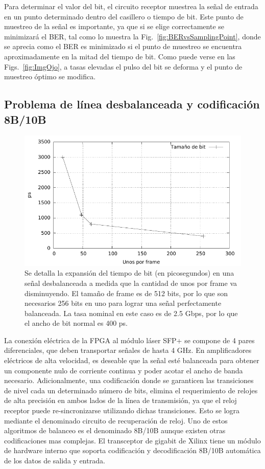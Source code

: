 Para determinar el valor del bit, el circuito receptor muestrea la señal de entrada en un punto determinado dentro del casillero o tiempo de bit. Este punto de muestreo de la señal es importante, ya que si se elige correctamente se minimizará el BER, tal como lo muestra la Fig.~\ref{fig:BERvsSamplingPoint}, donde se aprecia como el BER es minimizado si el punto de muestreo se encuentra aproximadamente en la mitad del tiempo de bit. 
Como puede verse en las Figs.~\ref{fig:ImgOjo}, a tasas elevadas el pulso del bit se deforma y el punto de muestreo óptimo se modifica.


\subsection{Problema de línea desbalanceada y codificación 8B/10B}

\begin{figure}[t]
  \centering
    \includegraphics[width=5in]{graphs/expansionbit.pdf}
\caption {Se detalla la expansión del tiempo de bit (en picosegundos) en una señal desbalanceada a medida que la cantidad de unos por frame va disminuyendo. El tamaño de frame es de 512 bits, por lo que son necesarios 256 bits en uno para lograr una señal perfectamente balanceada. La tasa nominal en este caso es de 2.5 Gbps, por lo que el ancho de bit normal es 400 ps.}
\label{fig:expansionbit}
\end{figure}

\label{problema8b10b}
La conexión eléctrica de la FPGA al módulo láser SFP+ se compone de 4 pares diferenciales, que deben transportar señales de hasta 4 GHz. En amplificadores eléctricos de alta velocidad, es deseable que la señal esté balanceada para obtener un componente nulo de corriente continua y poder acotar el ancho de banda necesario. Adicionalmente, una codificación donde se garanticen las transiciones de nivel cada un determinado número de bits, elimina el requerimiento de relojes de alta precisión en ambos lados de la línea de transmisión, ya que el reloj receptor puede re-sincronizarse utilizando dichas transiciones. Esto se logra mediante el denominado circuito de recuperación de reloj.
Uno de estos algoritmos de balanceo es el denominado 8B/10B aunque existen otras codificaciones mas complejas. El transceptor de gigabit de Xilinx tiene un módulo de hardware interno que soporta codificación y decodificación 8B/10B automática de los datos de salida y entrada.

